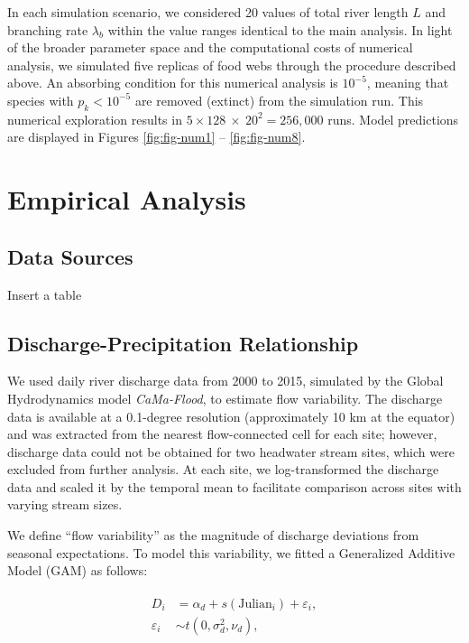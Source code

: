 \documentclass[11pt, class=article, crop=false]{standalone}
\begin{document}
In each simulation scenario, we considered 20 values of total river length $L$ and branching rate $\lambda_b$ within the value ranges identical to the main analysis.
In light of the broader parameter space and the computational costs of numerical analysis, we simulated five replicas of food webs through the procedure described above.
An absorbing condition for this numerical analysis is $10^{-5}$, meaning that species with $p_k < 10^{-5}$ are removed (extinct) from the simulation run.
This numerical exploration results in $5 \times 128~\times~20^2 = 256,000$ runs.
Model predictions are displayed in Figures \ref{fig:fig-num1} -- \ref{fig:fig-num8}.



\newpage



\section{Empirical Analysis}

\subsection{Data Sources}

Insert a table

\subsection{Discharge-Precipitation Relationship}
We used daily river discharge data from 2000 to 2015, simulated by the Global Hydrodynamics model \textit{CaMa-Flood}, to estimate flow variability.
The discharge data is available at a 0.1-degree resolution (approximately 10 km at the equator) and was extracted from the nearest flow-connected cell for each site; however, discharge data could not be obtained for two headwater stream sites, which were excluded from further analysis.
At each site, we log-transformed the discharge data and scaled it by the temporal mean to facilitate comparison across sites with varying stream sizes.

We define ``flow variability'' as the magnitude of discharge deviations from seasonal expectations.
To model this variability, we fitted a Generalized Additive Model (GAM) as follows:

\begin{align}
    \begin{split}
    D_i &= \alpha_d + s(\text{Julian}_i) + \varepsilon_i,\\
    \varepsilon_i &\sim t(0, \sigma_d^2, \nu_d),
    \end{split}
\end{align}
\end{document}
